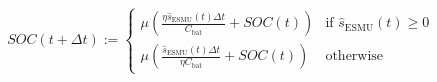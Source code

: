 \begin{equation}
	SOC(t+\Delta t) := 
	\begin{cases}
		\mu\left(\frac{\eta \hat{s}_\text{ESMU}(t)\Delta t}{C_\text{bat}} + SOC(t)\right)	&\text{if } \hat{s}_\text{ESMU}(t) \geq 0\\
		\mu\left(\frac{\hat{s}_\text{ESMU}(t)\Delta t}{\eta C_\text{bat}} + SOC(t)\right) &\text{otherwise}
	\end{cases}
	\label{ch1:equ:next-state-of-charge-2}
\end{equation}